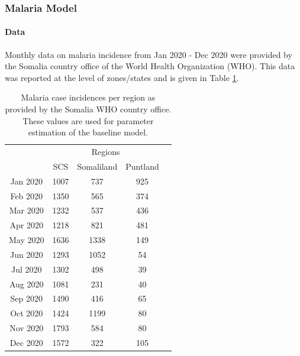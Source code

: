 \documentclass[letter,12pt, usenames,dvipsnames]{article}
\begin{document}
\subsubsection{Malaria Model}
\paragraph{Data} Monthly data on malaria incidence from Jan 2020 - Dec 2020 were provided by the Somalia country office of the World Health Organization (WHO).  This data was reported at the level of zones/states and is given in Table \ref{table:malariaData}.


\begin{table}[h!]
    \centering
    {\footnotesize
    \begin{tabular}{|c||c|c| c| c |}
        \hline
         &\multicolumn{3}{c|}{Regions}\\\cline{2-4}
         & SCS & Somaliland & Puntland\\\hline\hline	 
         
         Jan 2020 &1007&	737	& 925	\\\hline	 
         
         
        Feb 2020 &1350	&	565	&	374	\\\hline	 
         
        
        Mar 2020 & 	1232&		537&	436\\\hline
        
        Apr 2020 &	1218&	821&	481\\\hline
        
        May 2020 & 	1636&	1338&	149\\\hline
        
        Jun 2020 & 	1293&		1052& 54\\\hline
        
        Jul 2020 &	1302&		498&	39\\\hline
        
        Aug 2020 & 	1081&	231&	40\\\hline
        
        Sep 2020 &	1490&	416&	65\\\hline
        
        Oct 2020 & 	1424&	1199&80\\\hline
        
        Nov 2020 & 	1793& 584&	80\\\hline
        
        Dec 2020 & 	1572&	322&	105\\\hline
         
    \end{tabular}
    }
    \caption{Malaria case incidences per region as provided by the Somalia WHO country office.  These values are used for parameter estimation of the baseline model.}
     \label{table:malariaData}
\end{table}
\end{document}
